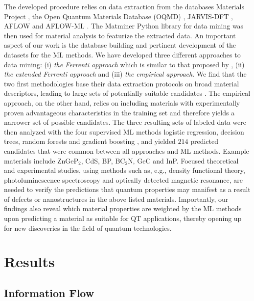 \documentclass[superscriptaddress,unsortedaddress,
 amsmath,amssymb,
 aps,
]{revtex4-2}
\begin{document}
The developed procedure relies on data extraction from the databases Materials Project \cite{Jain2013,Jain2018}, the Open Quantum Materials Database (OQMD) \cite{Saal2013, Kirklin2015}, JARVIS-DFT \cite{Choudhary2020}, AFLOW \cite{Curtarolo2012, Curtarolo2012a, Calderon2015} and AFLOW-ML \cite{Isayev2017}. 
The Matminer Python library for data mining \cite{Ward2018} was then used for material analysis to featurize the extracted data. An important aspect of our work is the database building and pertinent development of the datasets for the ML methods. We have developed three different approaches to data mining: (i) \emph{the Ferrenti approach} which is similar to that proposed by \citeauthor{Ferrenti2020} \cite{Ferrenti2020}, (ii) \emph{the extended Ferrenti approach} and (iii) \emph{the empirical approach}. We find that the two first methodologies base their data extraction protocols on broad material descriptors, leading to large sets of potentially suitable candidates \cite{Mehta2019,Hastie2009}. The empirical approach, on the other hand, relies on including materials with experimentally proven advantageous characteristics in the training set and therefore yields a narrower set of possible candidates. The three resulting sets of labeled data were then analyzed with the four supervised ML methods logistic regression, decision trees, random forests and gradient boosting \cite{Hastie2009,Murphy2012}, and yielded $214$ predicted candidates that were common between all approaches and ML methods.  
Example materials include ZnGeP$_2$, CdS, BP, BC$_2$N, GeC and InP. Focused theoretical and experimental studies, using methods such as, e.g., density functional theory, photoluminescence spectroscopy and optically detected magnetic resonance, are needed to verify the predictions that quantum properties may manifest as a result of defects or nanostructures in the above listed materials. 
Importantly, our findings also reveal which material properties are weighted by the ML methods upon predicting a material as suitable for QT applications, thereby opening up for new  discoveries in the field of quantum technologies. 


\section*{Results}

\subsection*{Information Flow} 
\end{document}
